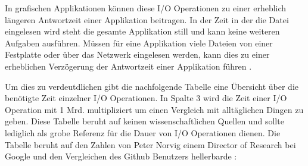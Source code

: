 In grafischen Applikationen können diese I/O Operationen zu einer erheblich längeren Antwortzeit einer Applikation beitragen. In der Zeit in der die Datei eingelesen wird  steht die gesamte Applikation still und kann keine weiteren Aufgaben ausführen. Müssen für eine Applikation viele Dateien von einer Festplatte oder über das Netzwerk eingelesen werden, kann dies zu einer erheblichen Verzögerung der Antwortzeit einer Applikation führen \cite[p. 307]{tan09}. 

Um dies zu verdeutdlichen gibt die nachfolgende Tabelle eine Übersicht über die benötigte Zeit einzelner I/O Operationen. In Spalte 3 wird die Zeit einer I/O Operation mit 1 Mrd. multipliziert um einen Vergleich mit alltäglichen Dingen zu geben. Diese Tabelle beruht auf keinen wissenschaftlichen Quellen und sollte lediglich als grobe Referenz für die Dauer von I/O Operationen dienen. Die Tabelle beruht auf den Zahlen von Peter Norvig \cite[]{Nor98} einem Director of Research bei Google und den Vergleichen des Github Benutzers hellerbarde \cite[]{Gis15}:

